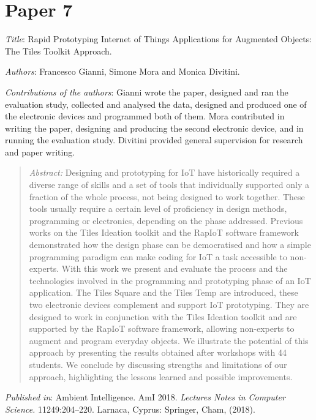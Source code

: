 \section[P7: Rapid Prototyping Internet of Things Applications for Augmented Objects: The Tiles Toolkit Approach.][Paper 7]{Paper 7}
\label{paper-7}

\emph{Title}: Rapid Prototyping Internet of Things Applications for Augmented Objects: The Tiles Toolkit Approach.

\emph{Authors}: Francesco Gianni, Simone Mora and Monica Divitini.

\emph{Contributions of the authors}: Gianni wrote the paper, designed and ran the evaluation study, collected and analysed the data, designed and produced one of the electronic devices and programmed both of them. Mora contributed in writing the paper, designing and producing the second electronic device, and in running the evaluation study. Divitini provided general supervision for research and paper writing.

\begin{quote}
	\emph{Abstract:} Designing and prototyping for IoT have historically required a diverse range of skills and a set of tools that individually supported only a fraction of the whole process, not being designed to work together. These tools usually require a certain level of proficiency in design methods, programming or electronics, depending on the phase addressed. Previous works on the Tiles Ideation toolkit and the RapIoT software framework demonstrated how the design phase can be democratised and how a simple programming paradigm can make coding for IoT a task accessible to non-experts. With this work we present and evaluate the process and the technologies involved in the programming and prototyping phase of an IoT application. The Tiles Square and the Tiles Temp are introduced, these two electronic devices complement and support IoT prototyping. They are designed to work in conjunction with the Tiles Ideation toolkit and are supported by the RapIoT software framework, allowing non-experts to augment and program everyday objects. We illustrate the potential of this approach by presenting the results obtained after workshops with 44 students. We conclude by discussing strengths and limitations of our approach, highlighting the lessons learned and possible improvements.
\end{quote}

\emph{Published in}: Ambient Intelligence. AmI 2018. \emph{Lectures Notes in Computer Science.} 11249:204--220. Larnaca, Cyprus: Springer, Cham, (2018).

